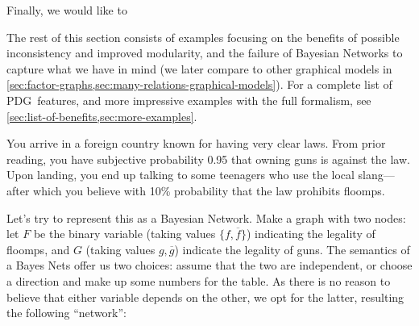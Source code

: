 \documentclass{article}
\newcommand\changed[1]{{\color{note-fg} #1}}
\newcommand{\MN}{PDG}
\begin{document}
	Finally, we would like to 
	
	The rest of this section consists of examples focusing on the benefits of possible inconsistency and improved modularity, and the failure of \changed{Bayesian Networks} to capture what we have in mind \changed{(we later compare to other graphical models in \cref{sec:factor-graphs,sec:many-relations-graphical-models}). For a complete list of \MN\ features, and more impressive examples with the full formalism,} see \cref{sec:list-of-benefits,sec:more-examples}.
	
	\begin{example}\label{ex:guns-and-floomps}
		You arrive in a foreign country known for having very clear laws. From prior reading, you have subjective probability 0.95 that owning guns is against the law. Upon landing, you end up talking to some teenagers who use the local slang---after which you believe with 10\% probability that the law prohibits floomps.
		
		Let's try to represent this as a Bayesian Network. Make a graph with two nodes: let $F$ be the binary variable (taking values $\{f, \overline f\}$) indicating the legality of floomps, and $G$ (taking values $g, \overline g$) indicate the legality of guns. 
		The semantics of a Bayes Nets offer us two choices: assume that the two are independent, or choose a direction and make up some numbers for the table.
		As there is no reason to believe that either variable depends on the other, we opt for the latter, resulting the following ``network'':	
		
		\begin{center}
		\end{center}
		

\end{example}
\end{document}

